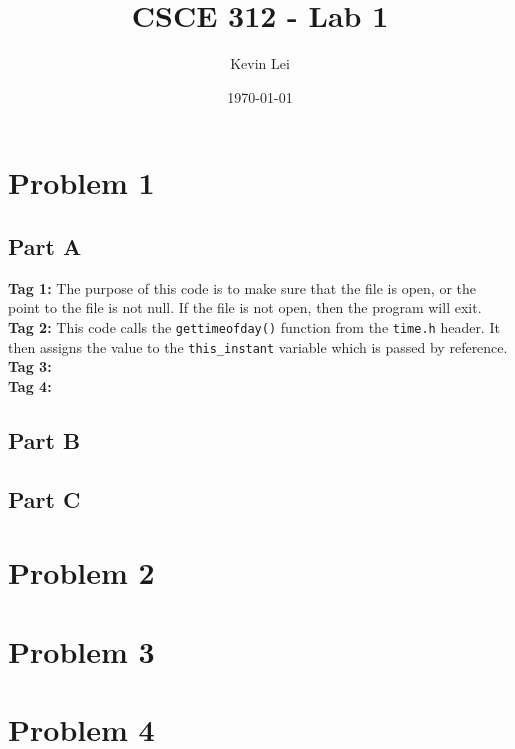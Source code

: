 \documentclass{article}
\title{CSCE 312 - Lab 1}
\author{Kevin Lei}
\date{\today}
\begin{document}
\maketitle

\begin{comment}
\begin{abstract}
The purpose of this lab is to introduce low-level system design.
\end{abstract}
\end{comment}

\section{Problem 1}

\subsection{Part A}
\textbf{Tag 1: } The purpose of this code is to make sure that the file is open, or the point to the file is not null. 
If the file is not open, then the program will exit.\\
\textbf{Tag 2: } This code calls the \lstinline!gettimeofday()! function from the \lstinline!time.h! header.
It then assigns the value to the \lstinline!this_instant! variable which is passed by reference. \\
\textbf{Tag 3: } \\
\textbf{Tag 4: } \\

\subsection{Part B}

\subsection{Part C}


\section{Problem 2}

\section{Problem 3}

\section{Problem 4}
\end{document}

